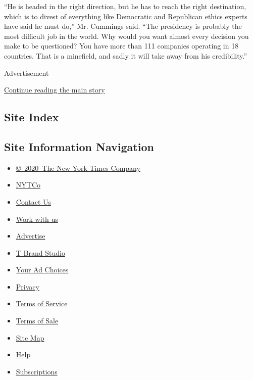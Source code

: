 ``He is headed in the right direction, but he has to reach the right
destination, which is to divest of everything like Democratic and
Republican ethics experts have said he must do,'' Mr. Cummings said.
``The presidency is probably the most difficult job in the world. Why
would you want almost every decision you make to be questioned? You have
more than 111 companies operating in 18 countries. That is a minefield,
and sadly it will take away from his credibility.''

Advertisement

\protect\hyperlink{after-bottom}{Continue reading the main story}

\hypertarget{site-index}{%
\subsection{Site Index}\label{site-index}}

\hypertarget{site-information-navigation}{%
\subsection{Site Information
Navigation}\label{site-information-navigation}}

\begin{itemize}
\tightlist
\item
  \href{https://help.nytimes.com/hc/en-us/articles/115014792127-Copyright-notice}{©~2020~The
  New York Times Company}
\end{itemize}

\begin{itemize}
\tightlist
\item
  \href{https://www.nytco.com/}{NYTCo}
\item
  \href{https://help.nytimes.com/hc/en-us/articles/115015385887-Contact-Us}{Contact
  Us}
\item
  \href{https://www.nytco.com/careers/}{Work with us}
\item
  \href{https://nytmediakit.com/}{Advertise}
\item
  \href{http://www.tbrandstudio.com/}{T Brand Studio}
\item
  \href{https://www.nytimes.com/privacy/cookie-policy\#how-do-i-manage-trackers}{Your
  Ad Choices}
\item
  \href{https://www.nytimes.com/privacy}{Privacy}
\item
  \href{https://help.nytimes.com/hc/en-us/articles/115014893428-Terms-of-service}{Terms
  of Service}
\item
  \href{https://help.nytimes.com/hc/en-us/articles/115014893968-Terms-of-sale}{Terms
  of Sale}
\item
  \href{https://spiderbites.nytimes.com}{Site Map}
\item
  \href{https://help.nytimes.com/hc/en-us}{Help}
\item
  \href{https://www.nytimes.com/subscription?campaignId=37WXW}{Subscriptions}
\end{itemize}
